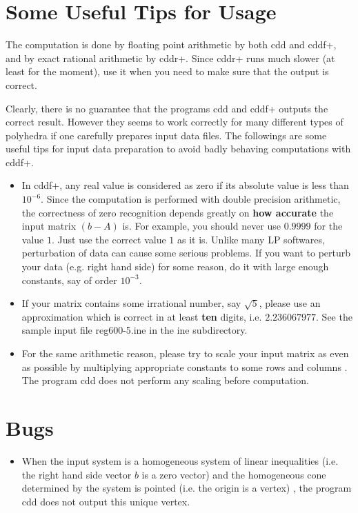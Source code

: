 \documentclass[11pt]{article}
\begin{document}
\section{Some  Useful Tips for Usage}  \label{TIPS}

The computation is done by floating point arithmetic by both cdd and cddf+,
and by exact rational arithmetic by cddr+. 
Since cddr+ runs much slower (at least for the moment),
use it when you need to make sure that the output is correct.

Clearly, there is no guarantee 
that the programs cdd and cddf+ outputs the correct result.  
However they seems to work correctly 
for many different types of polyhedra if one
carefully prepares input data files.   The followings
are some useful tips  for  input data preparation to 
avoid badly behaving computations with cddf+.

\begin{itemize}

\item  In cddf+, any real value is considered as zero if its absolute value is
less than $10^{-6}$.  Since the computation is performed with double precision
arithmetic, the correctness of zero recognition depends greatly on {\bf how
accurate\/} the input matrix $(b- A)$ is.  For example, you should never use
$0.9999$ for the value $1$.  Just use the correct value $1$ as it is.
Unlike many LP softwares, perturbation of data
can cause some serious problems.  If you want to perturb your data (e.g. right
hand side) for some reason, do it with large enough constants, say of order
$10^{-3}$.


\item If your matrix contains some irrational number, say
$\sqrt{5}$, please use an approximation which is correct in at least {\bf ten\/} digits,
i.e.  $2.236067977$.   See the sample input file  reg600-5.ine in the ine subdirectory.
 
\item  For the same arithmetic reason, please try to scale your input matrix
as even as possible by multiplying appropriate constants to some rows and
columns .   The program cdd does not perform any scaling before
computation.

\end{itemize}

\section{Bugs}  \label{BUGS}
\begin{itemize}

\item When the input system is a homogeneous system of linear inequalities
(i.e. the right hand side vector $b$ is a zero vector) and the homogeneous
cone determined by the system is pointed (i.e. the origin is a vertex) , 
the program cdd does not output this unique vertex.

\end{itemize}
\end{document}
